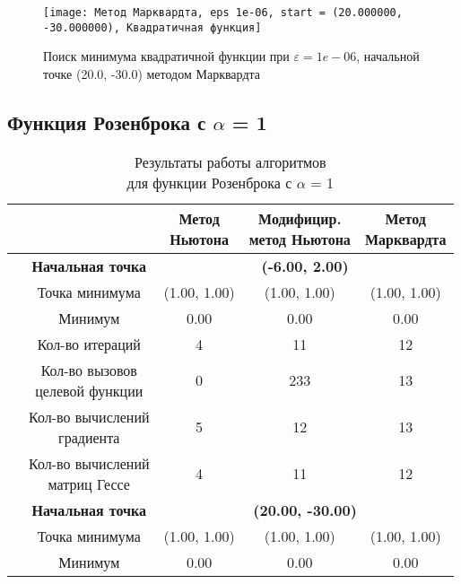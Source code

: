             \begin{figure}[H]
	        \centering
	        \texttt{[image: Метод Марквардта, eps 1e-06, start = (20.000000, -30.000000), Квадратичная функция]}%
	        \caption{Поиск минимума квадратичной функции при $\varepsilon = 1e-06$, начальной точке (20.0, -30.0) методом Марквардта}
	        \vspace*{-1.2cm}
            \end{figure}
            \subsection{Функция Розенброка с $\alpha$ = 1}

\begin{table}[H]
        \centering
        \vspace*{-1.5em}
        \caption{Результаты работы алгоритмов\\для функции Розенброка с $\alpha$ = 1}
        \footnotesize
        \begin{tabular}{|c|c|c|c|c|}
        \hline
        & &\makecell{Метод\\Ньютона} &\makecell{Модифицир.\\метод Ньютона} &\makecell{Метод\\Марквардта} \\
        \hline
	\multirow{12}{*}{\rotatebox[origin=c]{90}{$\varepsilon = 0.01$}}&\textbf{Начальная точка} &\multicolumn{3}{c|}{\textbf{(-6.00, 2.00)}}\\
	\cline{2-5}
	&Точка минимума &(1.00, 1.00) &(1.00, 1.00) &(1.00, 1.00) \\ 
	\cline{2-5}
	&Минимум &0.00 &0.00 &0.00 \\ 
	\cline{2-5}
	&Кол-во итераций &4 &11 &12 \\ 
	\cline{2-5}
	&\makecell{Кол-во вызовов\\целевой функции} &0 &233 &13 \\ 
	\cline{2-5}
	&\makecell{Кол-во вычислений\\градиента} &5 &12 &13 \\ 
	\cline{2-5}
	&\makecell{Кол-во вычислений\\матриц Гессе} &4 &11 &12 \\ 
	\cline{2-5}
\cline{2-5}&\textbf{Начальная точка} &\multicolumn{3}{c|}{\textbf{(20.00, -30.00)}}\\
	\cline{2-5}
	&Точка минимума &(1.00, 1.00) &(1.00, 1.00) &(1.00, 1.00) \\ 
	\cline{2-5}
	&Минимум &0.00 &0.00 &0.00 \\ 

\end{tabular}
\end{table}

